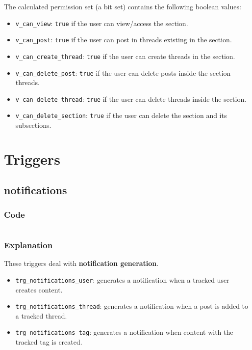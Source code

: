 \documentclass[12pt]{report}
\renewcommand\emph{\textbf}
\newcommand{\printSQLtest}[1]
{
    \inputminted[linenos, breaklines, breakbytoken, tabsize=4, fontsize=\footnotesize]{mysql}{#1}
}
\newcommand{\printSQLTablepage}[2]
{    
    \subsection{#2}
    \subsubsection{Code}
    \printSQLtest{../sql/parts/#1}
    \subsubsection{Explanation}
}
\begin{document}
                    The calculated permission set (a bit set) contains the following boolean values:

                    \begin{itemize}
                        \item \texttt{v_can_view}: \texttt{true} if the user can view/access the section.
                        \item \texttt{v_can_post}: \texttt{true} if the user can post in threads existing in the section.
                        \item \texttt{v_can_create_thread}: \texttt{true} if the user can create threads in the section.
                        \item \texttt{v_can_delete_post}: \texttt{true} if the user can delete posts inside the section threads.
                        \item \texttt{v_can_delete_thread}: \texttt{true} if the user can delete threads inside the section.
                        \item \texttt{v_can_delete_section}: \texttt{true} if the user can delete the section and its subsections.
                    \end{itemize}

                \newpage

            \section{Triggers}

                \printSQLTablepage{90_trgNotifications.sql}{notifications}
                    These triggers deal with \emph{notification generation}.

                    \begin{itemize}
                        \item \texttt{trg_notifications_user}: generates a notification when a tracked user creates content.
                        \item \texttt{trg_notifications_thread}: generates a notification when a post is added to a tracked thread.
                        \item \texttt{trg_notifications_tag}: generates a notification when content with the tracked tag is created.
                    \end{itemize}
\end{document}
